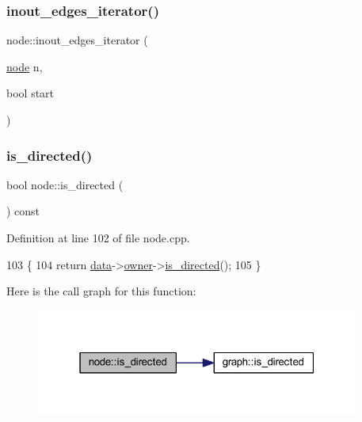 \subsubsection{\texorpdfstring{inout\+\_\+edges\+\_\+iterator()}{inout\_edges\_iterator()}\hspace{0.1cm}{\footnotesize\ttfamily [2/2]}}
{\footnotesize\ttfamily node\+::inout\+\_\+edges\+\_\+iterator (\begin{DoxyParamCaption}\item[{\mbox{\hyperlink{classnode}{node}}}]{n,  }\item[{bool}]{start }\end{DoxyParamCaption})}

\mbox{\label{classnode_a4937028da2c9035228b761347eaa6503}} 
\subsubsection{\texorpdfstring{is\+\_\+directed()}{is\_directed()}}
{\footnotesize\ttfamily bool node\+::is\+\_\+directed (\begin{DoxyParamCaption}{ }\end{DoxyParamCaption}) const\hspace{0.3cm}{\ttfamily [private]}}



Definition at line 102 of file node.\+cpp.


\begin{DoxyCode}
103 \{
104     \textcolor{keywordflow}{return} \mbox{\hyperlink{classnode_a4ae3d54ebb61be3a102bedf5b91bef75}{data}}->\mbox{\hyperlink{classnode__data_a20acb07c56fa28df6cbdbf3b0a02cb66}{owner}}->\mbox{\hyperlink{classgraph_afc510be7479fa903fde9e0e615470ab0}{is\_directed}}();
105 \}
\end{DoxyCode}
Here is the call graph for this function\+:\nopagebreak
\begin{figure}[H]
\begin{center}
\leavevmode
\includegraphics[width=301pt]{classnode_a4937028da2c9035228b761347eaa6503_cgraph}
\end{center}
\end{figure}
\mbox{\label{classnode_af948e15fd00a31e67928c9061acda582}} 

